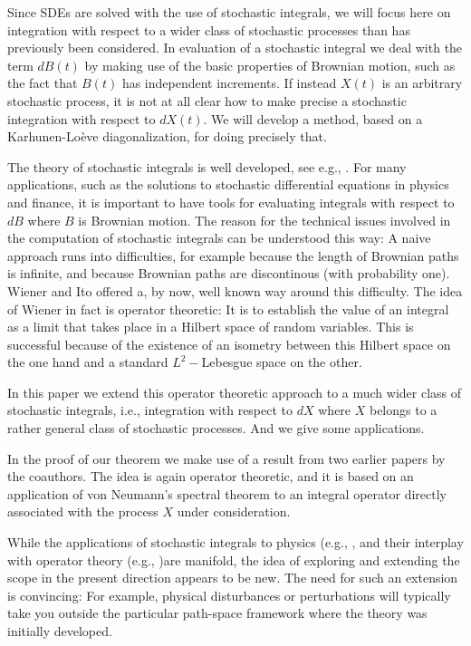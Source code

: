 \documentclass{amsart}
\theoremstyle{definition}
\theoremstyle{remark}
\numberwithin{equation}{section}
\begin{document}
Since SDEs are solved with the use of stochastic integrals, we will focus 
here on integration with respect to a wider class of stochastic processes 
than has previously been considered. In evaluation of a stochastic integral 
we deal with the term $dB(t)$ by making use of the basic properties of 
Brownian motion, such as the fact that $B(t)$ has independent increments. If 
instead $X(t)$ is an arbitrary stochastic process, it is not at all clear 
how to make precise a stochastic integration with respect to $dX(t)$. We 
will develop a method, based on a Karhunen-Lo\`{e}ve diagonalization, for 
doing precisely that. 

The theory of stochastic integrals is well developed, see e.g., 
\cite{Ku06, ItMc65}. For many applications, such as the solutions to 
stochastic differential equations in physics and finance, it is important 
to have tools for evaluating integrals with respect to $dB$ where $B$ is 
Brownian motion.  The reason for the technical issues involved in the 
computation of stochastic integrals can be understood this way:  A naive 
approach runs into difficulties, for example because the length of Brownian 
paths is infinite, and because Brownian paths are discontinous (with 
probability one). Wiener and Ito offered a, by now, well known way around 
this difficulty. The idea of Wiener in fact is operator theoretic: It is to 
establish the value of an integral as a limit that takes place in a Hilbert 
space of random variables. This is successful because of the existence of 
an isometry between this Hilbert space on the one hand and a standard 
$L^{2}-$Lebesgue space on the other.

In this paper we extend this operator theoretic approach to a much wider 
class of stochastic integrals, i.e., integration with respect to $dX$ where 
$X$ belongs to a rather general class of stochastic processes. And we give 
some applications.

In the proof of our theorem we make use of a result from two earlier papers 
\cite{JS07, JS08} by the coauthors. The idea is again operator theoretic, 
and it is based on an application of von Neumann's spectral theorem to an 
integral operator directly associated with the process $X$ under 
consideration. 

While the applications of stochastic integrals to physics (e.g., \cite{BC97}, 
and their interplay with operator theory (e.g., \cite{AL08a})are manifold, the 
idea of exploring and extending the scope in the present direction appears to 
be new. The need for such an extension is convincing:  For example, physical 
disturbances or perturbations will typically take you outside the particular 
path-space framework where the theory was initially developed. 
\end{document}

